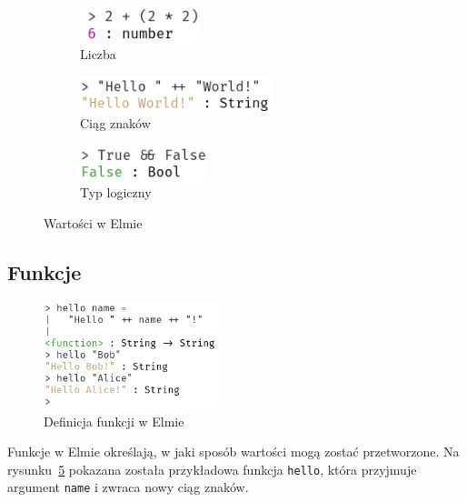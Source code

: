 \documentclass[twoside,a4paper]{report}
\begin{document}
\begin{figure}[H]
    \centering
    \begin{subfigure}{.29\textwidth}
        \centering
        \includegraphics[height=1cm]{img/repl_number}
        \caption{Liczba}\label{lab:repl_number}
    \end{subfigure}
    \begin{subfigure}{.4\textwidth}
        \centering
        \includegraphics[height=1cm]{img/repl_string}
        \caption{Ciąg znaków}\label{lab:repl_string}
    \end{subfigure}
    \begin{subfigure}{.29\textwidth}
        \centering
        \includegraphics[height=1cm]{img/repl_bool}
        \caption{Typ logiczny}\label{lab:repl_bool}
    \end{subfigure}
    \caption{Wartości w Elmie}\label{lab:repl_values}
\end{figure}

\subsection*{Funkcje}
\begin{figure}
    \centering
    \includegraphics[width=0.45\textwidth]{img/repl_func}
    \caption{Definicja funkcji w Elmie}\label{lab:repl_func}
\end{figure}

Funkcje w Elmie określają, w jaki sposób wartości mogą zostać przetworzone.
Na rysunku~\ref{lab:repl_func} pokazana została przykładowa funkcja \texttt{hello}, która przyjmuje argument \texttt{name} i zwraca nowy ciąg znaków.
\end{document}
